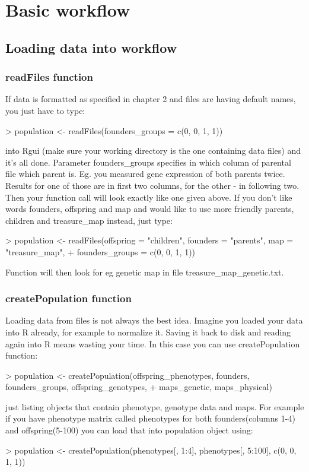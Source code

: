 \documentclass{article}
\begin{document}
\newpage
\section{Basic workflow}
\subsection{Loading data into workflow}
\subsubsection{readFiles function}
If data is formatted as specified in chapter 2 and files are having default names, you just have to type: 
\begin{Schunk}
\begin{Sinput}
> population <- readFiles(founders_groups = c(0, 0, 1, 1))
\end{Sinput}
\end{Schunk}
 into Rgui (make sure your working directory is the one containing data files) and it's all done. Parameter founders\_groups specifies in which column of parental file which parent is. Eg. you measured gene expression of both parents twice. Results for one of those are in first two columns, for the other - in following two. Then your function call will look exactly like one given above. 
If you don't like words founders, offspring and map and would like to use more friendly parents, children and treasure\_map instead, just type:
\begin{Schunk}
\begin{Sinput}
> population <- readFiles(offspring = "children", founders = "parents", map = "treasure_map", 
+     founders_groups = c(0, 0, 1, 1))
\end{Sinput}
\end{Schunk}
Function will then look for eg genetic map in file treasure\_map\_genetic.txt.
\subsubsection{createPopulation function}
Loading data from files is not always the best idea. Imagine you loaded your data into R already, for example to normalize it. Saving it back to disk and reading again into R means wasting your time. In this case you can use createPopulation function:
\begin{Schunk}
\begin{Sinput}
> population <- createPopulation(offspring_phenotypes, founders, founders_groups, offspring_genotypes, 
+     maps_genetic, maps_physical)
\end{Sinput}
\end{Schunk}
just listing objects that contain phenotype, genotype data and maps. For example if you have phenotype matrix called phenotypes for both founders(columns 1-4) and offspring(5-100) you can load that into population object using:
\begin{Schunk}
\begin{Sinput}
> population <- createPopulation(phenotypes[, 1:4], phenotypes[, 5:100], c(0, 0, 1, 1))
\end{Sinput}
\end{Schunk}
\end{document}
